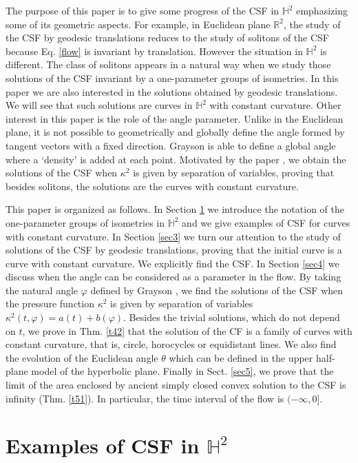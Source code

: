 \documentclass[12pt]{amsart}
\theoremstyle{plain}
\theoremstyle{definition}
\def\h{\mathbb H}
\def\r{\mathbb R}
\begin{document}
The purpose of this paper is to give some progress of the CSF in $\h^2$ emphasizing some of its geometric aspects. For example, in Euclidean plane $\r^2$, the study of the CSF by geodesic translations reduces to the study of solitons of the CSF because Eq. \eqref{flow} is invariant by translation. However the situation in $\h^2$ is different. The class of solitons appears in a natural way when we study those solutions of the CSF invariant by a one-parameter groups of isometries. In this paper we are also interested in the solutions obtained by geodesic translations. We will see that such solutions are curves in $\h^2$  with constant curvature. Other interest in this paper is the role of the angle parameter.  Unlike in the Euclidean plane, it is not possible to geometrically and globally define the angle formed by tangent vectors with a fixed direction. Grayson is able to define a global angle where a `density' is added at each point. Motivated by the paper \cite{dhs}, we obtain the solutions of the CSF when $\kappa^2$ is given by separation of variables, proving that besides solitons, the solutions are the curves with constant curvature.
 

This paper is organized as follows. In Section \ref{sec2} we introduce the notation of the one-parameter groups of isometries in $\h^2$ and we give examples of CSF for curves with constant curvature. In Section \ref{sec3} we turn our attention to the study of  solutions of the CSF by geodesic translations, proving that the initial curve is a curve with constant curvature. We explicitly find the CSF. In Section \ref{sec4} we discuss when the angle can be considered as a parameter in the flow. By taking the natural angle $\varphi$ defined by Grayson \cite{gr}, we find the solutions of the CSF when the pressure function $\kappa^2$ is given by separation of variables $\kappa^2(t,\varphi)=a(t)+b(\varphi)$. Besides the trivial solutions, which do not depend on $t$, we prove in Thm. \ref{t42} that the solution of the CF is a family of curves with constant curvature, that is, circle,  horocycles or equidistant lines. We also find the evolution of the Euclidean angle $\theta$ which can be defined in the upper half-plane model of the hyperbolic plane. Finally in Sect. \ref{sec5}, we prove that the limit of the area enclosed by ancient simply closed convex solution to the CSF is infinity (Thm. \ref{t51}). In particular, the time interval of the flow is $(-\infty,0]$. 

\section{Examples of CSF in $\h^2$} \label{sec2}
\end{document}
